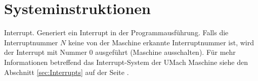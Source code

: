 \section{Systeminstruktionen}

\glqq Interrupt\grqq.
Generiert ein Interrupt in der Programmausführung.
Falls die Interruptnummer $N$ keine von der Maschine erkannte Interruptnummer
ist, wird der Interrupt mit Nummer 0 ausgeführt (Maschine ausschalten).
Für mehr Informationen betreffend das Interrupt-System der UMach Maschine siehe
den Abschnitt \ref{sec:Interrupts} auf der Seite \pageref{sec:Interrupts}.


